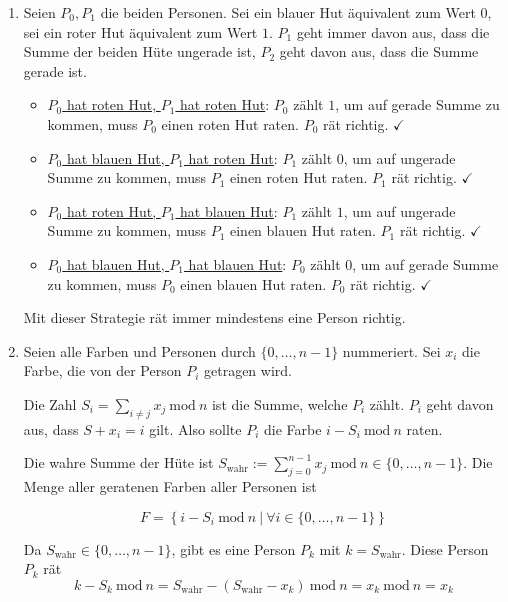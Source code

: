 \documentclass[12pt]{article}
\begin{document}
\begin{enumerate}[label=(\alph*)]
    \item Seien $P_0, P_1$ die beiden Personen. Sei ein blauer Hut äquivalent zum Wert $0$, sei ein roter Hut äquivalent zum Wert $1$. $P_1$ geht immer davon aus, dass die Summe der beiden Hüte ungerade ist, $P_2$ geht davon aus, dass die Summe gerade ist.
    
    \begin{itemize}
        \item \underline{$P_0$ hat roten Hut, $P_1$ hat roten Hut}: $P_0$ zählt $1$, um auf gerade Summe zu kommen, muss $P_0$ einen roten Hut raten. $P_0$ rät richtig. $\checkmark$
        \item \underline{$P_0$ hat blauen Hut, $P_1$ hat roten Hut}: $P_1$ zählt $0$, um auf ungerade Summe zu kommen, muss $P_1$ einen roten Hut raten. $P_1$ rät richtig. $\checkmark$
        \item \underline{$P_0$ hat roten Hut, $P_1$ hat blauen Hut}: $P_1$ zählt $1$, um auf ungerade Summe zu kommen, muss $P_1$ einen blauen Hut raten. $P_1$ rät richtig. $\checkmark$
        \item \underline{$P_0$ hat blauen Hut, $P_1$ hat blauen Hut}: $P_0$ zählt $0$, um auf gerade Summe zu kommen, muss $P_0$ einen blauen Hut raten. $P_0$ rät richtig. $\checkmark$
    \end{itemize}

    Mit dieser Strategie rät immer mindestens eine Person richtig.

    \item Seien alle Farben und Personen durch $\{0, \dots, n-1\}$ nummeriert. Sei $x_i$ die Farbe, die von der Person $P_i$ getragen wird.
    
    Die Zahl $S_i = \sum_{i \neq j} x_j \ \mathrm{mod}\ n$ ist die Summe, welche $P_i$ zählt. $P_i$ geht davon aus, dass $S + x_i = i$ gilt. Also sollte $P_i$ die Farbe $i - S_i \ \mathrm{mod} \ n$ raten.

    Die wahre Summe der Hüte ist $S_{\text{wahr}} := \sum_{j = 0}^{n-1} x_j \ \mathrm{mod}\ n \in \{0,\dots,n-1\}$. Die Menge aller geratenen Farben aller Personen ist

    $$
        F = \left\{i - S_i \ \mathrm{mod} \ n \ |\ \forall i \in \{0,\dots,n-1\} \right\}
    $$

    Da $S_{\text{wahr}} \in \{0,\dots,n-1\}$, gibt es eine Person $P_k$ mit $k = S_{\text{wahr}}$. Diese Person $P_k$ rät 
    $$
        k - S_k \ \mathrm{mod}\ n = S_{\text{wahr}} - (S_{\text{wahr}} - x_k) \ \mathrm{mod}\ n = x_k \ \mathrm{mod}\ n = x_k
    $$


\end{enumerate}
\end{document}
